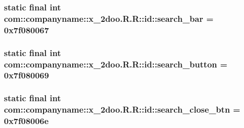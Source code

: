 \hypertarget{classcom_1_1companyname_1_1x__2doo_1_1_r_1_1id_45f7bdda6c7b9995caecaa48510283a5}{
\subsubsection[{search\_\-bar}]{\setlength{\rightskip}{0pt plus 5cm}static final int com::companyname::x\_\-2doo.R.R::id::search\_\-bar = 0x7f080067}}
\label{classcom_1_1companyname_1_1x__2doo_1_1_r_1_1id_45f7bdda6c7b9995caecaa48510283a5}


\hypertarget{classcom_1_1companyname_1_1x__2doo_1_1_r_1_1id_b6493c538625419d869c96a98868ff92}{
\subsubsection[{search\_\-button}]{\setlength{\rightskip}{0pt plus 5cm}static final int com::companyname::x\_\-2doo.R.R::id::search\_\-button = 0x7f080069}}
\label{classcom_1_1companyname_1_1x__2doo_1_1_r_1_1id_b6493c538625419d869c96a98868ff92}


\hypertarget{classcom_1_1companyname_1_1x__2doo_1_1_r_1_1id_d17c1dfc94470d4728e17bdd07f52a1e}{
\subsubsection[{search\_\-close\_\-btn}]{\setlength{\rightskip}{0pt plus 5cm}static final int com::companyname::x\_\-2doo.R.R::id::search\_\-close\_\-btn = 0x7f08006e}}
\label{classcom_1_1companyname_1_1x__2doo_1_1_r_1_1id_d17c1dfc94470d4728e17bdd07f52a1e}


